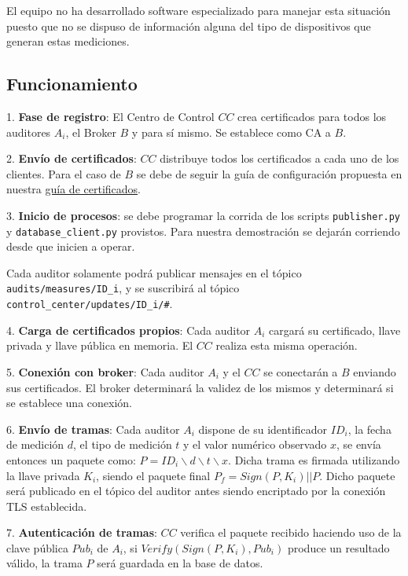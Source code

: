 \documentclass{article}
\begin{document}
            El equipo no ha desarrollado software especializado para manejar esta situación puesto que no se dispuso de información alguna del tipo de dispositivos que generan estas mediciones.

        \subsection{Funcionamiento}

            1. \textbf{Fase de registro}: El Centro de Control $CC$ crea certificados para todos los auditores $A_i$, el Broker $B$ y para sí mismo. Se establece como CA a $B$.

            2. \textbf{Envío de certificados}: $CC$ distribuye todos los certificados a cada uno de los clientes. Para el caso de $B$ se debe de seguir la guía de configuración propuesta en nuestra \href{https://github.com/JuanEcheagaray75/licore-pki/blob/master/src/.test_certs/README.md}{guía de certificados}.

            3. \textbf{Inicio de procesos}: se debe programar la corrida de los scripts \texttt{publisher.py} y \texttt{database\_client.py} provistos. Para nuestra demostración se dejarán corriendo desde que inicien a operar.

            Cada auditor solamente podrá publicar mensajes en el tópico \texttt{audits/measures/ID\_i}, y se suscribirá al tópico \texttt{control\_center/updates/ID\_i/\#}.

            4. \textbf{Carga de certificados propios}: Cada auditor $A_i$ cargará su certificado, llave privada y llave pública en memoria. El $CC$ realiza esta misma operación.

            5. \textbf{Conexión con broker}: Cada auditor $A_i$ y el $CC$ se conectarán a $B$ enviando sus certificados. El broker determinará la validez de los mismos y determinará si se establece una conexión.

            6. \textbf{Envío de tramas}: Cada auditor $A_i$ dispone de su identificador $ID_i$, la fecha de medición $d$, el tipo de medición $t$ y el valor numérico observado $x$, se envía entonces un paquete como: $P = ID_i \backslash d \backslash t \backslash x$. Dicha trama es firmada utilizando la llave privada $K_i$, siendo el paquete final $P_f = Sign(P, K_i) || P$. Dicho paquete será publicado en el tópico del auditor antes siendo encriptado por la conexión TLS establecida.

            7. \textbf{Autenticación de tramas}: $CC$ verifica el paquete recibido haciendo uso de la clave pública $Pub_i$ de $A_i$, si $Verify(Sign(P, K_i), Pub_i)$ produce un resultado válido, la trama $P$ será guardada en la base de datos.
\end{document}
